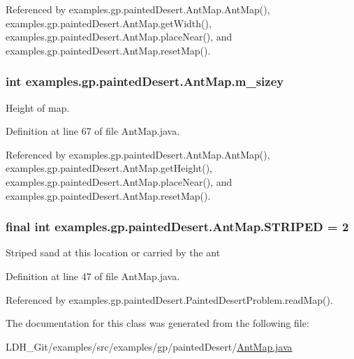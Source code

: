 Referenced by examples.\-gp.\-painted\-Desert.\-Ant\-Map.\-Ant\-Map(), examples.\-gp.\-painted\-Desert.\-Ant\-Map.\-get\-Width(), examples.\-gp.\-painted\-Desert.\-Ant\-Map.\-place\-Near(), and examples.\-gp.\-painted\-Desert.\-Ant\-Map.\-reset\-Map().

\hypertarget{classexamples_1_1gp_1_1painted_desert_1_1_ant_map_a35b5883a121b1ae1301a39b9cf185fd3}{
\subsubsection[{m\-\_\-sizey}]{\setlength{\rightskip}{0pt plus 5cm}int examples.\-gp.\-painted\-Desert.\-Ant\-Map.\-m\-\_\-sizey\hspace{0.3cm}{\ttfamily [private]}}}\label{classexamples_1_1gp_1_1painted_desert_1_1_ant_map_a35b5883a121b1ae1301a39b9cf185fd3}
Height of map. 

Definition at line 67 of file Ant\-Map.\-java.



Referenced by examples.\-gp.\-painted\-Desert.\-Ant\-Map.\-Ant\-Map(), examples.\-gp.\-painted\-Desert.\-Ant\-Map.\-get\-Height(), examples.\-gp.\-painted\-Desert.\-Ant\-Map.\-place\-Near(), and examples.\-gp.\-painted\-Desert.\-Ant\-Map.\-reset\-Map().

\hypertarget{classexamples_1_1gp_1_1painted_desert_1_1_ant_map_a06515b627b9763787dd76324bd151d73}{
\subsubsection[{S\-T\-R\-I\-P\-E\-D}]{\setlength{\rightskip}{0pt plus 5cm}final int examples.\-gp.\-painted\-Desert.\-Ant\-Map.\-S\-T\-R\-I\-P\-E\-D = 2\hspace{0.3cm}{\ttfamily [static]}}}\label{classexamples_1_1gp_1_1painted_desert_1_1_ant_map_a06515b627b9763787dd76324bd151d73}
Striped sand at this location or carried by the ant 

Definition at line 47 of file Ant\-Map.\-java.



Referenced by examples.\-gp.\-painted\-Desert.\-Painted\-Desert\-Problem.\-read\-Map().



The documentation for this class was generated from the following file\-:\begin{DoxyCompactItemize}
\item 
L\-D\-H\-\_\-\-Git/examples/src/examples/gp/painted\-Desert/\hyperlink{painted_desert_2_ant_map_8java}{Ant\-Map.\-java}\end{DoxyCompactItemize}
